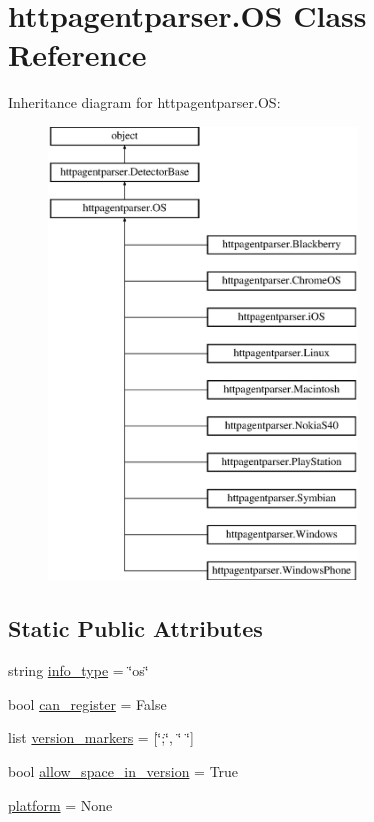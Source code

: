 \hypertarget{classhttpagentparser_1_1_o_s}{}\section{httpagentparser.\+OS Class Reference}
\label{classhttpagentparser_1_1_o_s}
Inheritance diagram for httpagentparser.\+OS\+:\begin{figure}[H]
\begin{center}
\leavevmode
\includegraphics[height=12.000000cm]{classhttpagentparser_1_1_o_s}
\end{center}
\end{figure}
\subsection*{Static Public Attributes}
\begin{DoxyCompactItemize}
\item 
string \hyperlink{classhttpagentparser_1_1_o_s_af4c5bfb28e00aee54925609a234031d3}{info\+\_\+type} = \char`\"{}os\char`\"{}
\item 
bool \hyperlink{classhttpagentparser_1_1_o_s_a9f9e3726f000afb0496798169de83d80}{can\+\_\+register} = False
\item 
list \hyperlink{classhttpagentparser_1_1_o_s_ace772b4f9442311faff87dc663d54938}{version\+\_\+markers} = \mbox{[}\char`\"{};\char`\"{}, \char`\"{} \char`\"{}\mbox{]}
\item 
bool \hyperlink{classhttpagentparser_1_1_o_s_a4166e3cef1eeb5141c4762fb20504f7b}{allow\+\_\+space\+\_\+in\+\_\+version} = True
\item 
\hyperlink{classhttpagentparser_1_1_o_s_acb4eafb62ce8ebabb23d950cd87e9458}{platform} = None
\end{DoxyCompactItemize}
